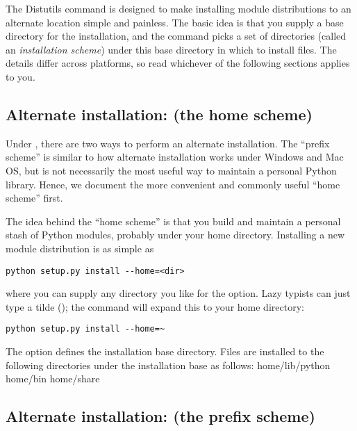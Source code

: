 \documentclass{howto}
\begin{document}
The Distutils  command is designed to make installing
module distributions to an alternate location simple and painless.  The
basic idea is that you supply a base directory for the installation, and
the  command picks a set of directories (called an
\emph{installation scheme}) under this base directory in which to
install files.  The details differ across platforms, so read whichever
of the following sections applies to you.


\subsection{Alternate installation: \UNIX{} (the home scheme)}
\label{alt-install-prefix}

Under \UNIX, there are two ways to perform an alternate installation.
The ``prefix scheme'' is similar to how alternate installation works
under Windows and Mac OS, but is not necessarily the most useful way to
maintain a personal Python library.  Hence, we document the more
convenient and commonly useful ``home scheme'' first.

The idea behind the ``home scheme'' is that you build and maintain a
personal stash of Python modules, probably under your home directory.
Installing a new module distribution is as simple as

\begin{verbatim}
python setup.py install --home=<dir>
\end{verbatim}

where you can supply any directory you like for the 
option.  Lazy typists can just type a tilde (\code{\textasciitilde}); the
 command will expand this to your home directory:

\begin{verbatim}
python setup.py install --home=~
\end{verbatim}

The  option defines the installation base
directory.  Files are installed to the following directories under the
installation base as follows:
              {home}{/lib/python}
              {home}{/bin}
              {home}{/share}

\subsection{Alternate installation: \UNIX{} (the prefix scheme)}
\label{alt-install-home}
\end{document}
